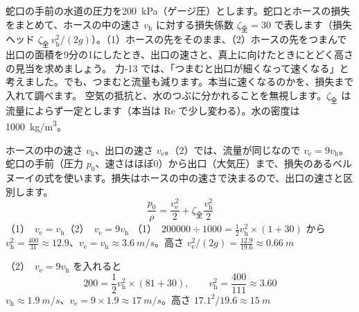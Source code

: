 \begin{phreidai}\label{ph:力-14:ex11}
蛇口の手前の水道の圧力を\qty{200}{kPa}（ゲージ圧）とします。蛇口とホースの損失をまとめて、ホースの中の速さ $v_{\mathrm h}$ に対する損失係数 $\zeta_{\text{全}}=30$ で表します（損失ヘッド $\zeta_{\text{全}}\,v_{\mathrm h}^2/(2g)$）。（1）ホースの先をそのまま、（2）ホースの先をつまんで出口の面積を9分の1にしたとき、出口の速さと、真上に向けたときにとどく高さの見当を求めましょう。
\phbamen
力-13 では、「つまむと出口が細くなって速くなる」と考えました。でも、つまむと流量も減ります。本当に速くなるのかを、損失まで入れて調べます。
\phmushi
空気の抵抗と、水のつぶに分かれることを無視します。$\zeta_{\text{全}}$ は流量によらず一定とします（本当は Re で少し変わる）。水の密度は\qty{1000}{kg/m^3}。
\phzu
\begin{center}
\end{center}
ホースの中の速さ $v_{\mathrm h}$、出口の速さ $v_{\mathrm e}$。（2）では、流量が同じなので $v_{\mathrm e}=9v_{\mathrm h}$。
\phriyu
蛇口の手前（圧力 $p_0$、速さはほぼ0）から出口（大気圧）まで、損失のあるベルヌーイの式を使います。損失はホースの中の速さで決まるので、出口の速さと区別します。
\phtateru
\[\frac{p_0}{\rho}=\frac{v_{\mathrm e}^2}{2}+\zeta_{\text{全}}\frac{v_{\mathrm h}^2}{2}\]
（1）\nobreak\ $v_{\mathrm e}=v_{\mathrm h}$\qquad（2）\nobreak\ $v_{\mathrm e}=9v_{\mathrm h}$
\phtoku
（1）\nobreak\ $\num{200000}\div 1000=\tfrac{1}{2}v_{\mathrm h}^2\times(1+30)$ から $v_{\mathrm h}^2=\tfrac{400}{31}\approx12.9$、$v_{\mathrm e}=v_{\mathrm h}\approx\qty{3.6}{m/s}$。高さ $v_{\mathrm e}^2/(2g)=\tfrac{12.9}{19.6}\approx\qty{0.66}{m}$\par
（2）\nobreak\ $v_{\mathrm e}=9v_{\mathrm h}$ を入れると
\[200=\frac{1}{2}v_{\mathrm h}^2\times(81+30),\qquad v_{\mathrm h}^2=\frac{400}{111}\approx3.60\]
$v_{\mathrm h}\approx\qty{1.9}{m/s}$、$v_{\mathrm e}=9\times1.9\approx\qty{17}{m/s}$。高さ $17.1^2/19.6\approx\qty{15}{m}$\par

\end{phreidai}

